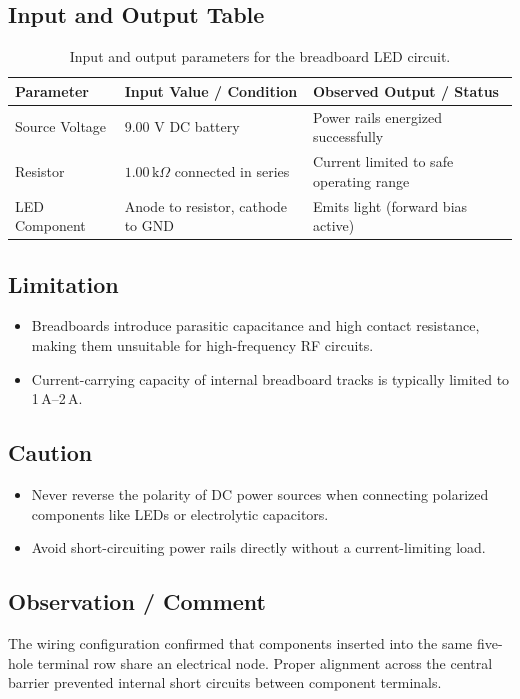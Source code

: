 \documentclass[11pt,a4paper]{article}
\begin{document}
\subsection{Input and Output Table}
\begin{table}[H]
    \centering
    \caption{Input and output parameters for the breadboard LED circuit.}
    \label{tab:part1_io}
    \begin{tabularx}{\textwidth}{@{}l L L@{}}
        \toprule
        \textbf{Parameter} & \textbf{Input Value / Condition} & \textbf{Observed Output / Status} \\
        \midrule
        Source Voltage & 9.00 V DC battery & Power rails energized successfully \\
        Resistor & $1.00\,\text{k}\Omega$ connected in series & Current limited to safe operating range \\
        LED Component & Anode to resistor, cathode to GND & Emits light (forward bias active) \\
        \bottomrule
    \end{tabularx}
\end{table}

\subsection{Limitation}
\begin{itemize}
    \item Breadboards introduce parasitic capacitance and high contact resistance, making them unsuitable for high-frequency RF circuits.
    \item Current-carrying capacity of internal breadboard tracks is typically limited to 1\,A--2\,A.
\end{itemize}

\subsection{Caution}
\begin{itemize}
    \item Never reverse the polarity of DC power sources when connecting polarized components like LEDs or electrolytic capacitors.
    \item Avoid short-circuiting power rails directly without a current-limiting load.
\end{itemize}

\subsection{Observation / Comment}
The wiring configuration confirmed that components inserted into the same five-hole terminal row share an electrical node. Proper alignment across the central barrier prevented internal short circuits between component terminals.
\end{document}
